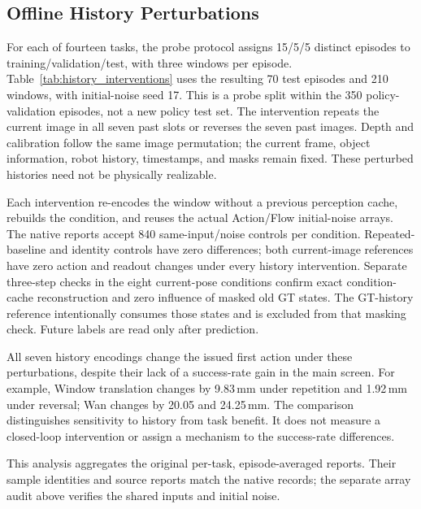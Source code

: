 \subsection{Offline History Perturbations}

For each of fourteen tasks, the probe protocol assigns 15/5/5 distinct
episodes to training/validation/test, with three windows per episode.
Table~\ref{tab:history_interventions} uses the resulting 70 test episodes and
210 windows, with initial-noise seed 17. This is a probe split within the
350 policy-validation episodes, not a new policy test set.
The intervention repeats the current image in all seven past slots or reverses
the seven past images. Depth and calibration follow the same image permutation;
the current frame, object information, robot history, timestamps, and masks
remain fixed. These perturbed histories need not be physically realizable.

Each intervention re-encodes the window without a previous perception cache,
rebuilds the condition, and reuses the actual Action/Flow initial-noise arrays.
The native reports accept 840 same-input/noise controls per condition.
Repeated-baseline and identity controls have zero differences; both
current-image references have zero action and readout changes under every
history intervention. Separate three-step checks in the eight current-pose
conditions confirm exact condition-cache reconstruction and zero influence
of masked old GT states. The GT-history reference intentionally consumes
those states and is excluded from that masking check. Future labels are
read only after prediction.

All seven history encodings change the issued first action under these
perturbations, despite their lack of a success-rate gain in the main screen.
For example, Window translation changes by 9.83\,mm under repetition and
1.92\,mm under reversal; Wan changes by 20.05 and 24.25\,mm.
The comparison distinguishes sensitivity to history from task benefit.
It does not measure a closed-loop intervention or assign a mechanism to
the success-rate differences.

This analysis aggregates the original per-task, episode-averaged reports.
Their sample identities and source reports match the native records; the
separate array audit above verifies the shared inputs and initial noise.

